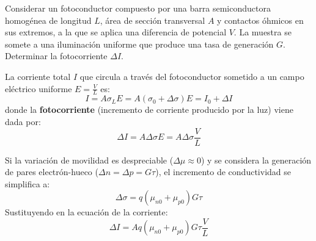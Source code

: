\begin{ejemplo}
Considerar un fotoconductor compuesto por una barra semiconductora homogénea de longitud $L$, área de sección transversal $A$ y contactos óhmicos en sus extremos, a la que se aplica una diferencia de potencial $V$. La muestra se somete a una iluminación uniforme que produce una tasa de generación $G$. Determinar la fotocorriente $\Delta I$.

\tcblower

La corriente total $I$ que circula a través del fotoconductor sometido a un campo eléctrico uniforme $E = \frac{V}{L}$ es:
\[
I = A \sigma_L E = A (\sigma_0 + \Delta\sigma) E = I_0 + \Delta I
\]
donde la \textbf{fotocorriente} (incremento de corriente producido por la luz) viene dada por:
\[
\Delta I = A \Delta\sigma E = A \Delta\sigma \frac{V}{L}
\]

Si la variación de movilidad es despreciable ($\Delta\mu \approx 0$) y se considera la generación de pares electrón-hueco ($\Delta n = \Delta p = G \tau$), el incremento de conductividad se simplifica a:
\[
\Delta\sigma = q (\mu_{n0} + \mu_{p0}) G \tau
\]
Sustituyendo en la ecuación de la corriente:
\[
\Delta I = A q (\mu_{n0} + \mu_{p0}) G \tau \frac{V}{L}
\]
\end{ejemplo}

